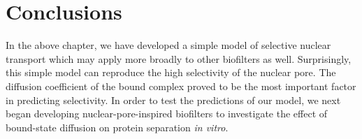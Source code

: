 \section{Conclusions}

In the above chapter, we have developed a simple model of selective nuclear transport which may apply more broadly to other biofilters as well.  Surprisingly, this simple model can reproduce the high selectivity of the nuclear pore.  The diffusion coefficient of the bound complex proved to be the most important factor in predicting selectivity.  In order to test the predictions of our model, we next began developing nuclear-pore-inspired biofilters to investigate the effect of bound-state diffusion on protein separation \textit{in vitro}.
